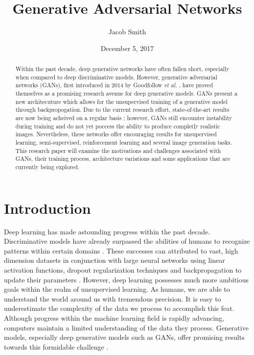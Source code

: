 \documentclass[11pt]{article}
\title{Generative Adversarial Networks}
\author{Jacob Smith}
\date{December 5, 2017}
\begin{document}
\maketitle

\begin{abstract}
    Within the past decade, deep generative networks have often fallen short, especially when compared to deep discriminative models. However, generative adversarial networks (GANs), first introduced in 2014 by Goodfollow \textit{et al.} \citep{2014arXiv1406.2661G}, have proved themselves as a promising research avenue for deep generative models. GANs present a new architecuture which allows for the unsupervised training of a generative model through backpropogation. Due to the current research effort, state-of-the-art results are now being acheived on a regular basis \citep{2017arXiv171010196K, 2017arXiv171111585W}; however, GANs still encounter instability during training and do not yet poccess the ability to produce completly realistic images. Nevertheless, these networks offer encouraging results for unsupervised learning, semi-supervised, reinforcement learning and several image generation tasks. This research paper will examine the motivations and challenges associated with GANs, their training process, architecture variations and some applications that are currently being explored.
\end{abstract}

\section{Introduction}
Deep learning has made astounding progress within the past decade. Discriminative models have already surpassed the abilities of humans to recognize patterns within certain domains \citep{2014arXiv1404.7828S}. These successes can attributed to vast, high dimension datasets in conjunction with large neural networks using linear activation functions, dropout regularization techniques and backpropagation to update their parameters \citep{2014arXiv1406.2661G}. However, deep learning possesses much more ambitious goals within the realm of unsupervised learning. As humans, we are able to understand the world around us with tremendous precision. It is easy to underestimate the complexity of the data we process to accomplish this feat. Although progress within the machine learning field is rapidly advancing, computers maintain a limited understanding of the data they process. Generative models, especially deep generative models such as GANs, offer promising results towards this formidable challenge \citep{genmodelingopenai}.
\end{document}
